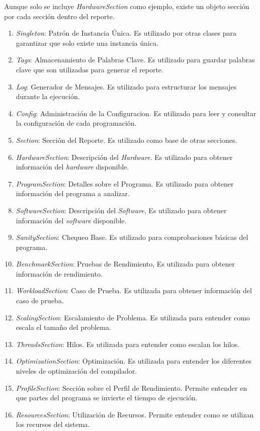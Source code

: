\documentclass[a4paper]{report}
\begin{document}
Aunque solo se incluye {\it HardwareSection} como ejemplo, existe un objeto sección por cada sección dentro del reporte.

\begin{enumerate}
\item {\it Singleton}: Patrón de Instancia Única. Es utilizado por otras clases para garantizar que solo existe una instancia única.
\item {\it Tags}: Almacenamiento de Palabras Clave. Es utilizado para guardar palabras clave que son utilizadas para generar el reporte.
\item {\it Log}: Generador de Mensajes. Es utilizado para estructurar los mensajes durante la ejecución.
\item {\it Config}: Administración de la Configuracion. Es utilizado para leer y consultar la configuración de cada programación.
\item {\it Section}: Sección del Reporte. Es utilizado como base de otras secciones.
\item {\it HardwareSection}: Descripción del {\it Hardware}. Es utilizado para obtener información del {\it hardware} disponible.
\item {\it ProgramSection}: Detalles sobre el Programa. Es utilizado para obtener información del programa a analizar.
\item {\it SoftwareSection}: Descripción del {\it Software}, Es utilizado para obtener información del {\it software} disponible.
\item {\it SanitySection}: Chequeo Base. Es utilizado para comprobaciones básicas del programa.
\item {\it BenchmarkSection}: Pruebas de Rendimiento, Es utilizada para obtener información de rendimiento.
\item {\it WorkloadSection}: Caso de Prueba. Es utilizada para obtener información del caso de prueba.
\item {\it ScalingSection}: Escalamiento de Problema. Es utilizada para entender como escala el tamaño del problema.
\item {\it ThreadsSection}: Hilos. Es utilizada para entender como escalan los hilos.
\item {\it OptimizationSection}: Optimización. Es utilizada para entender los diferentes niveles de optimización del compilador.
\item {\it ProfileSection}: Sección sobre el Perfil de Rendimiento. Permite entender en que partes del programa se invierte el tiempo de ejecución.
\item {\it ResourcesSection}: Utilización de Recursos. Permite entender como se utilizan los recursos del sistema.

\end{enumerate}
\end{document}
